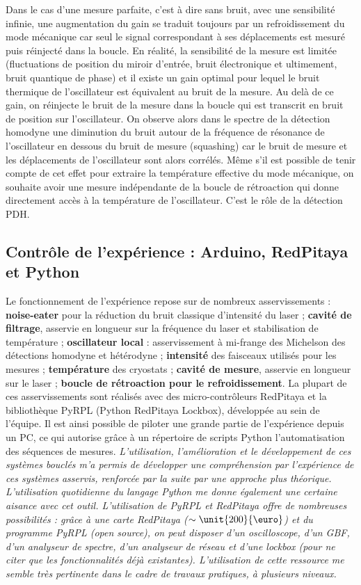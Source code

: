 \documentclass[12pt,a4paper]{article}
\begin{document}
Dans le cas d'une mesure parfaite, c'est à dire sans bruit, avec une sensibilité infinie, une augmentation du gain se traduit toujours par un refroidissement du mode mécanique car seul le signal correspondant à ses déplacements est mesuré puis réinjecté dans la boucle.
En réalité, la sensibilité de la mesure est limitée (fluctuations de position du miroir d'entrée, bruit électronique et ultimement, bruit quantique de phase) et il existe un gain optimal pour lequel le bruit thermique de l'oscillateur est équivalent au bruit de la mesure.
Au delà de ce gain, on réinjecte le bruit de la mesure dans la boucle qui est transcrit en bruit de position sur l'oscillateur.
On observe alors dans le spectre de la détection homodyne une diminution du bruit autour de la fréquence de résonance de l'oscillateur en dessous du bruit de mesure (squashing) car le bruit de mesure et les déplacements de l'oscillateur sont alors corrélés.
Même s'il est possible de tenir compte de cet effet pour extraire la température effective du mode mécanique, on souhaite avoir une mesure indépendante de la boucle de rétroaction qui donne directement accès à la température de l'oscillateur.
C'est le rôle de la détection PDH.

\subsection{Contrôle de l'expérience : Arduino, RedPitaya et Python}

Le fonctionnement de l'expérience repose sur de nombreux asservissements : \textbf{noise-eater} pour la réduction du bruit classique d'intensité du laser ; \textbf{cavité de filtrage}, asservie en longueur sur la fréquence du laser et stabilisation de température ; \textbf{oscillateur local} : asservissement à mi-frange des Michelson des détections homodyne et hétérodyne ; \textbf{intensité} des faisceaux utilisés pour les mesures ; \textbf{température} des cryostats ; \textbf{cavité de mesure}, asservie en longueur sur le laser ; \textbf{boucle de rétroaction pour le refroidissement}.
La plupart de ces asservissements sont réalisés avec des micro-contrôleurs RedPitaya et la bibliothèque PyRPL (Python RedPitaya Lockbox), développée au sein de l'équipe.
Il est ainsi possible de piloter une grande partie de l'expérience depuis un PC, ce qui autorise grâce à un répertoire de scripts Python l'automatisation des séquences de mesures.
\textit{L'utilisation, l'amélioration et le développement de ces systèmes bouclés m'a permis de développer une compréhension par l'expérience de ces systèmes asservis, renforcée par la suite par une approche plus théorique.
L'utilisation quotidienne du langage Python me donne également une certaine aisance avec cet outil.
L'utilisation de PyRPL et RedPitaya offre de nombreuses possibilités : grâce à une carte RedPitaya ($\sim\unit{200}{\text{\euro}}$) et du programme PyRPL (open source), on peut disposer d'un oscilloscope, d'un GBF, d'un analyseur de spectre, d'un analyseur de réseau et d'une lockbox (pour ne citer que les fonctionnalités déjà existantes). L'utilisation de cette ressource me semble très pertinente dans le cadre de travaux pratiques, à plusieurs niveaux.}
\end{document}
